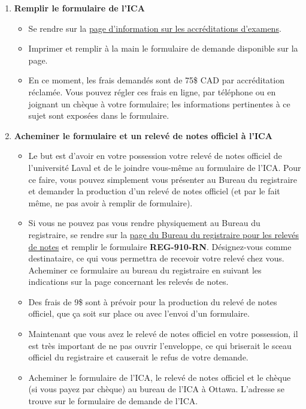\begin{enumerate}
\item \textbf{Remplir le formulaire de l'ICA}
\begin{itemize}
\item Se rendre sur la \href{http://www.cia-ica.ca/fr/adhesion/programme-d-agr\%C3\%A9ment-universitaire-(pau)-de-l-ica---page-d'accueil/renseignements-pour-les-candidats}{page d'information sur les accréditations d'examens}. 
\item Imprimer et remplir à la main le formulaire de demande disponible sur la page.
\item En ce moment, les frais demandés sont de 75\$ CAD par accréditation réclamée. Vous pouvez régler ces frais en ligne, par téléphone ou en joignant un chèque à votre formulaire; les informations pertinentes à ce sujet sont exposées dans le formulaire.
\end{itemize}\vspace{\baselineskip}
\item \textbf{Acheminer le formulaire et un relevé de notes officiel à l'ICA}
\begin{itemize}
\item Le but est d'avoir en votre possession votre relevé de notes officiel de l'université Laval et de le joindre vous-même au formulaire de l'ICA. Pour ce faire, vous pouvez simplement vous présenter au Bureau du registraire et demander la production d'un relevé de notes officiel (et par le fait même, ne pas avoir à remplir de formulaire).
\item Si vous ne pouvez pas vous rendre physiquement au Bureau du registraire, se rendre sur la \href{https://www.reg.ulaval.ca/cms/DemDoc/releveNotes}{page du Bureau du registraire pour les relevés de notes} et remplir le formulaire \textbf{REG-910-RN}. Désignez-vous comme destinataire, ce qui vous permettra de recevoir votre relevé chez vous. Acheminer ce formulaire au bureau du registraire en suivant les indications sur la page concernant les relevés de notes. 
\item Des frais de 9\$ sont à prévoir pour la production du relevé de notes officiel, que ça soit sur place ou avec l'envoi d'un formulaire.
\item Maintenant que vous avez le relevé de notes officiel en votre possession, il est très important de ne pas ouvrir l'enveloppe, ce qui briserait le sceau officiel du registraire et causerait le refus de votre demande.
\item Acheminer le formulaire de l'ICA, le relevé de notes officiel et le chèque (si vous payez par chèque) au bureau de l'ICA à Ottawa. L'adresse se trouve sur le formulaire de demande de l'ICA.
\end{itemize}
\end{enumerate}

\newpage

